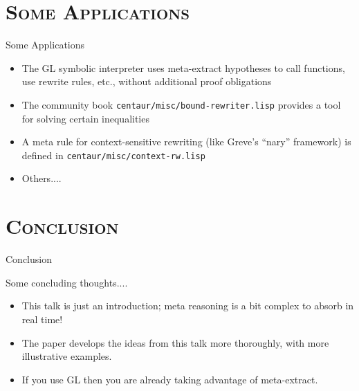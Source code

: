 \section[\scshape Applications]{\scshape Some Applications}
\begin{frame}[fragile] {Some Applications}

\begin{itemize}

\item The GL symbolic interpreter uses meta-extract hypotheses to call
  functions, use rewrite rules, etc., without additional proof
  obligations

\item The community book {\tt centaur/misc/bound-rewriter.lisp}
  provides a tool for solving certain inequalities

\item A meta rule for context-sensitive rewriting (like Greve's
  ``nary'' framework) is defined in {\tt centaur/misc/context-rw.lisp}

\item Others....

\end{itemize}

\end{frame}
\section{\scshape Conclusion}
\begin{frame}[fragile] {Conclusion}

Some concluding thoughts....

\begin{itemize}

\item This talk is just an introduction; meta reasoning is a bit
  complex to absorb in real time!

\item The paper develops the ideas from this talk more thoroughly,
  with more illustrative examples.

\item If you use GL then you are already taking advantage of
  meta-extract.

\end{itemize}

\end{frame}


